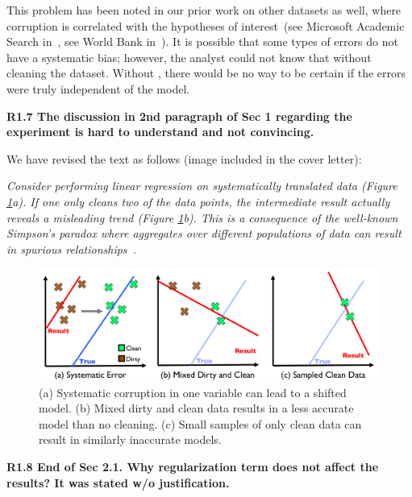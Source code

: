 This problem has been noted in our prior work on other datasets as well, where corruption is correlated with the hypotheses of interest~(see Microsoft Academic Search in~\cite{wang1999sample}, see World Bank in~\cite{activecleanarxiv}). It is possible that some types of errors do not have a systematic bias; however, the analyst could not know that without cleaning the dataset.
Without \sys, there would be no way to be certain if the errors were truly independent of the model.

\vspace{0.5em}

\noindent\textbf{R1.7 The discussion in 2nd paragraph of Sec 1 regarding the experiment is hard to understand and not convincing.}

\noindent We have revised the text as follows (image included in the cover letter):

\emph{Consider performing linear regression on systematically translated data (Figure \ref{update-arch-coverletter}a).
If one only cleans two of the data points, the intermediate result actually reveals a misleading trend (Figure \ref{update-arch-coverletter}b).
This is a consequence of the well-known Simpson's paradox where aggregates over different populations of data can result in spurious relationships~\cite{simpson1951interpretation}.}

\begin{figure}[ht!]
\centering
 \includegraphics[width=\columnwidth]{figs/update-arch.png}
 \caption{(a) Systematic corruption in one variable can lead to a shifted model. 
 (b) Mixed dirty and clean data results in a less accurate model than no cleaning.
(c) Small samples of only clean data can result in similarly inaccurate models. \label{update-arch-coverletter}}
\end{figure}

\vspace{0.5em}

\noindent\textbf{R1.8 End of Sec 2.1. Why regularization term does not affect the results? It was stated w/o justification.}

